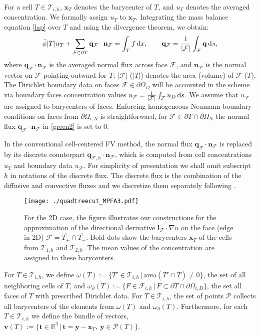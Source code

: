 \documentclass{article}
\newcommand{\bn}{\mathbf n}
\newcommand{\bv}{\mathbf v}
\newcommand{\bl}{\mathbf l}
\newcommand{\bx}{\mathbf x}
\newcommand{\bq}{\mathbf q}
\newcommand{\bt}{\mathbf t}
\newcommand{\by}{\mathbf y}
\newcommand{\F}{\mathcal F}
\newcommand{\T}{\mathcal T}
\def\dO{{\partial\Omega} }
\begin{document}
For a cell $T\in\T_{i,h}$, $\bx_{T}$ denotes the barycenter of $T$, and $u_T$ denotes the averaged concentration. We formally assign $u_T$ to $\bx_T$.
Integrating the mass balance equation \eqref{lap} over $T$ and using the divergence theorem, we obtain:
\begin{equation}\label{green2}
 \tilde\phi|T|u_T +\sum\limits_{\F \in \partial T} \bq_\F\cdot \bn_\F  =  \int_T f \,{\rm d} x,
  \qquad
  \bq_{\F} = \frac{1}{|\F|} \int_{\F}  \bq \,{\rm d} s,
\end{equation}
where $\bq_{\F} \cdot \bn_\F$ is the averaged normal flux across face $\F$,  and $\bn_\F$  is the normal vector
on $\F$ pointing outward for $T$; $|\F|$ ($|T|$) denotes the area (volume) of $\F$ ($T$).
The Dirichlet boundary data on faces $\F\in \partial\Omega_D$ will be accounted in the scheme via boundary faces concentration values
$u_\F = \frac{1}{|\F|}\int_{\F}  u_D \,{\rm d} s$. We assume that $u_\F$ are assigned to barycenters of faces.
 Enforcing homogeneous Neumann boundary conditions on faces from $\dO_{i,N}$ is straightforward, for $\F\in  \partial T\cap\dO_{N}$ the normal flux $\bq_\F\cdot \bn_\F$ in \eqref{green2} is  set to 0.

In the conventional cell-centered FV method, the normal flux $\bq_\F\cdot \bn_\F$ is replaced by its discrete counterpart $\bq_{\F,h} \cdot \bn_\F$, which is computed
from cell concentrations $u_T$ and boundary data $u_\F$. For simplicity of presentation we shall omit subscript $h$ in notations of the discrete flux.
The discrete flux is the combination of the diffusive and convective fluxes and we discretize them separately
following  \cite{Lipnikov:10,Lipnikov:12,NikitinVassilevski:10}.

\begin{figure}[h!]
\centering
\texttt{[image: ./quadtreecut\_MPFA3.pdf]}
\caption{For the 2D case, the figure illustrates our constructions for the approximation of the directional derivative $\bl_{\F}\cdot\nabla u$ on the face (edge in 2D) $\F=\overline{T_+}\cap\overline{T_-}$. Bold dots
show the barycenters $\bx_T$ of the cells from $\T_{1,h}$ and $\T_{2,h}$. The mean values of the concentration are assigned to these barycenters.}
\label{fig:dupl}
\end{figure}

For $T\in\T_{i,h}$, we define $\omega(T):=\{T'\in\T_{i,h}\,|\,\mbox{area}(\overline{T}'\cap \overline{T})\neq 0\}$, the set of all neighboring cells of $T$, and
 $\omega_{\partial}(T):=\{F\in\F_{i,h}\,|\,F{\subset} \partial T\cap \partial\Omega_{i,D}\}$, the set all faces of $T$ with prescribed Dirichlet data.  For $T\in\T_{i,h}$, the set of points $\mathcal{P}$ collects all barycenters of the elements from $\omega(T)$ and $\omega_{\partial}(T)$.  Furthermore, for each $T\in\T_{i,h}$ we define the bundle of vectors, $\bv(T):=\{\bt\in\mathbb{R}^3\,|\,\bt=\by-\bx_T,~\by\in \mathcal{P}(T)\}$.
\end{document}
